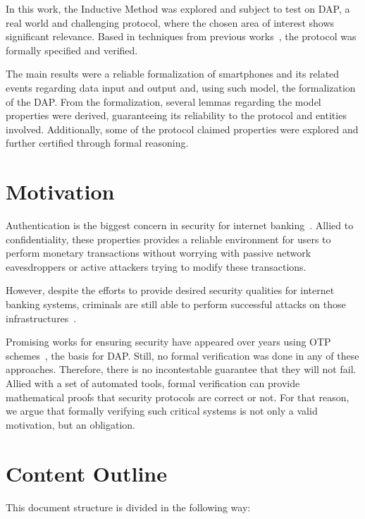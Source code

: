 In this work, the Inductive Method was explored and subject to test on DAP, a real world and challenging protocol, where the chosen area of interest shows significant relevance. Based in techniques from previous works~\cite{BellaPaulson2006, Paulson99, Paulson98}, the protocol was formally specified and verified.

The main results were a reliable formalization of smartphones and its related events regarding data input and output and, using such model, the formalization of the DAP. From the formalization, several lemmas regarding the model properties were derived, guaranteeing its reliability to the protocol and entities involved. Additionally, some of the protocol claimed properties were explored and further certified through formal reasoning.




\section{Motivation}
Authentication is the biggest concern in security for internet banking~\cite{Hutchinson2003}. Allied to confidentiality, these properties provides a reliable environment for users to perform monetary transactions without worrying with passive network eavesdroppers or active attackers trying to modify these transactions.

However, despite the efforts to provide desired security qualities for internet banking systems, criminals are still able to perform successful attacks on those infrastructures~\cite{Adham2013}.

Promising works for ensuring security have appeared over years using OTP schemes~\cite{Starnberger2009, LeeHyunLim2010}, the basis for DAP\@. Still, no formal verification was done in any of these approaches. Therefore, there is no incontestable guarantee that they will not fail. Allied with a set of automated tools, formal verification can provide mathematical proofs that security protocols are correct or not. For that reason, we argue that formally verifying such critical systems is not only a valid motivation, but an obligation.



\section{Content Outline}

This document structure is divided in the following way:


